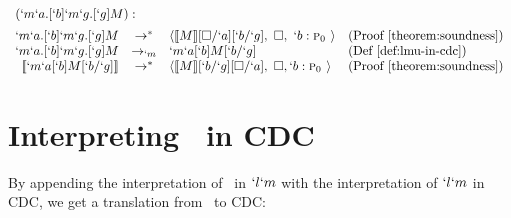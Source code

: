 \begin{Proof}
\[
\begin{array}{rcllll}
\prooflabel{(`m`a.[`b]`m`g.[`g]M)} \\
  `m`a.[`b]`m`g.[`g]M & \to^{*} & \langle \tr{M}[\square/`a][`b/`g],\ \square,\ `b:\gp \rangle
          & \text{(Proof \ref{theorem:soundness})} \\
  `m`a.[`b]`m`g.[`g]M & \to_{`m} & `m`a[`b]M[`b/`g]
          & \text{(Def \ref{def:lmu-in-cdc})} \\
  \tr{`m`a[`b]M[`b/`g]} & \to^{*} & \langle \tr{M}[`b/`g][\square/`a],\ \square, `b:\gp \rangle
          & \text{(Proof \ref{theorem:soundness})}
\end{array}
\]
\end{Proof}


\section{Interpreting \ltry\ in CDC}

  By appending the interpretation of \ltry\ in $`l`m$ with the interpretation of
  $`l`m$ in CDC, we get a translation from \ltry\ to CDC:

